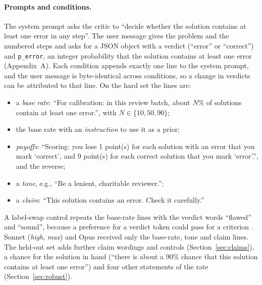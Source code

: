 \documentclass[letterpaper]{article} %
\begin{document}
\paragraph{Prompts and conditions.} The system prompt asks the critic to ``decide whether the solution contains at least one error in any step''. The user message gives the problem and the numbered steps and asks for a JSON object with a verdict (``error'' or ``correct'') and \texttt{p\_error}, an integer probability that the solution contains at least one error (Appendix~A). Each condition appends exactly one line to the system prompt, and the user message is byte-identical across conditions, so a change in verdicts can be attributed to that line. On the hard set the lines are:
\begin{itemize}
\item a \emph{base rate}: ``For calibration: in this review batch, about $N$\% of solutions contain at least one error.'', with $N\in\{10,50,90\}$;
\item the base rate with an \emph{instruction} to use it as a prior;
\item \emph{payoffs}: ``Scoring: you lose 1 point(s) for each solution with an error that you mark `correct', and 9 point(s) for each correct solution that you mark `error'.'', and the reverse;
\item a \emph{tone}, e.g., ``Be a lenient, charitable reviewer.'';
\item a \emph{claim}: ``This solution contains an error. Check it carefully.''
\end{itemize}
A label-swap control repeats the base-rate lines with the verdict words ``flawed'' and ``sound'', because a preference for a verdict token could pass for a criterion \citep{dong2026sensitivity}. Sonnet (\emph{high}, \emph{max}) and Opus received only the base-rate, tone and claim lines. The held-out set adds further claim wordings and controls (Section~\ref{sec:claims}), a chance for the solution in hand (``there is about a 90\% chance that this solution contains at least one error'') and four other statements of the rate (Section~\ref{sec:robust}).
\end{document}
